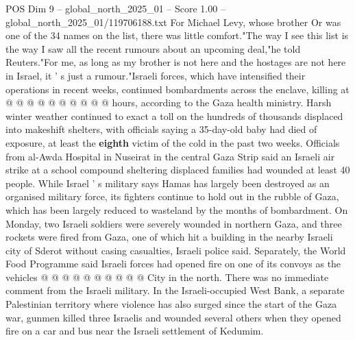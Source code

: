 \begin{textsample}{POS Dim 9 – global\_north\_2025\_01 – Score 1.00 – global\_north\_2025\_01/119706188.txt}
For Michael Levy, whose brother Or was one of the 34 names on the list, there was little comfort."The way I see this list is the way I saw all the recent rumours about an upcoming deal,"he told Reuters."For me, as long as my brother is not here and the hostages are not here in Israel, it ' s just a rumour."Israeli forces, which have intensified their operations in recent weeks, continued bombardments across the enclave, killing at @ @ @ @ @ @ @ @ @ @ hours, according to the Gaza health ministry.
Harsh winter weather continued to exact a toll on the hundreds of thousands displaced into makeshift shelters, with officials saying a 35-day-old baby had died of exposure, at least the \textbf{eighth} victim of the cold in the past two weeks.
Officials from al-Awda Hospital in Nuseirat in the central Gaza Strip said an Israeli air strike at a school compound sheltering displaced families had wounded at least 40 people.
While Israel ' s military says Hamas has largely been destroyed as an organised military force, its fighters continue to hold out in the rubble of Gaza, which has been largely reduced to wasteland by the months of bombardment.
On Monday, two Israeli soldiers were severely wounded in northern Gaza, and three rockets were fired from Gaza, one of which hit a building in the nearby Israeli city of Sderot without casing casualties, Israeli police said.
Separately, the World Food Programme said Israeli forces had opened fire on one of its convoys as the vehicles @ @ @ @ @ @ @ @ @ @ City in the north.
There was no immediate comment from the Israeli military.
In the Israeli-occupied West Bank, a separate Palestinian territory where violence has also surged since the start of the Gaza war, gunmen killed three Israelis and wounded several others when they opened fire on a car and bus near the Israeli settlement of Kedumim.

\end{textsample}
